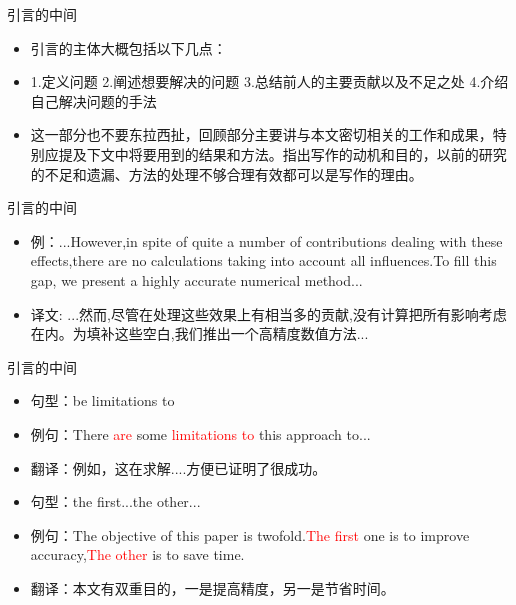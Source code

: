 \documentclass[13pt]{ctexbeamer}
\newcommand{\red}[1]{\textcolor{red}{#1}}
\begin{document}
\begin{frame}{引言的中间}

\begin{itemize}
    \item
    引言的主体大概包括以下几点：
    \item
    1.定义问题  2.阐述想要解决的问题  3.总结前人的主要贡献以及不足之处  4.介绍自己解决问题的手法
    \item
    这一部分也不要东拉西扯，回顾部分主要讲与本文密切相关的工作和成果，特别应提及下文中将要用到的结果和方法。指出写作的动机和目的，以前的研究的不足和遗漏、方法的处理不够合理有效都可以是写作的理由。
\end{itemize}
\end{frame}

\begin{frame}{引言的中间}

\begin{itemize}
    \item
    例：...However,in spite of quite a number of contributions dealing with these effects,there are no calculations taking into account all influences.To fill this gap, we present a highly accurate numerical method...
    \item 译文: ...然而,尽管在处理这些效果上有相当多的贡献,没有计算把所有影响考虑在内。为填补这些空白,我们推出一个高精度数值方法...

\end{itemize}
\end{frame}

\begin{frame}{引言的中间}

\begin{itemize}
    \item 句型：be limitations to
    \item 例句：There \red{are} some \red{limitations to} this approach to...
    \item 翻译：例如，这在求解....方便已证明了很成功。
    \newline
    \item 句型：the first...the other...
    \item 例句：The objective of this paper is twofold.\red{The first} one is to improve accuracy,\red{The other} is to save time.
    \item 翻译：本文有双重目的，一是提高精度，另一是节省时间。

\end{itemize}
\end{frame}
\end{document}
